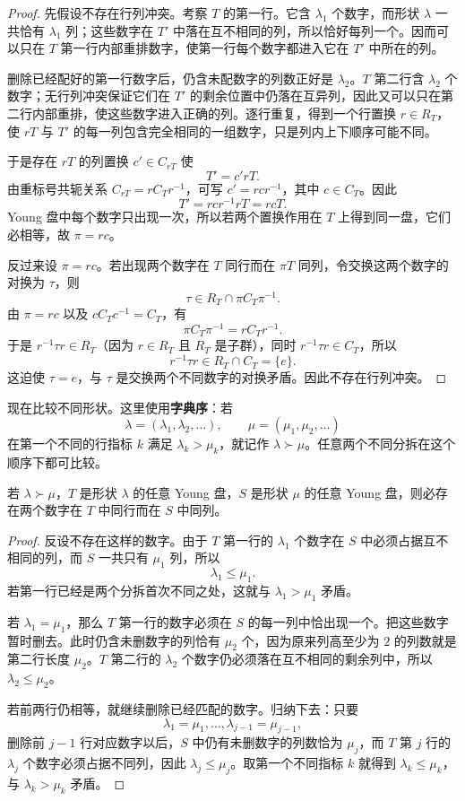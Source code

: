 \begin{proof}
先假设不存在行列冲突。考察 $T$ 的第一行。它含 $\lambda_1$ 个数字，而形状 $\lambda$ 一共恰有 $\lambda_1$ 列；这些数字在 $T'$ 中落在互不相同的列，所以恰好每列一个。因而可以只在 $T$ 第一行内部重排数字，使第一行每个数字都进入它在 $T'$ 中所在的列。

删除已经配好的第一行数字后，仍含未配数字的列数正好是 $\lambda_2$。$T$ 第二行含 $\lambda_2$ 个数字；无行列冲突保证它们在 $T'$ 的剩余位置中仍落在互异列，因此又可以只在第二行内部重排，使这些数字进入正确的列。逐行重复，得到一个行置换 $r\in R_T$，使 $rT$ 与 $T'$ 的每一列包含完全相同的一组数字，只是列内上下顺序可能不同。

于是存在 $rT$ 的列置换 $c'\in C_{rT}$ 使
\[
T'=c'rT.
\]
由重标号共轭关系 $C_{rT}=rC_Tr^{-1}$，可写 $c'=rcr^{-1}$，其中 $c\in C_T$。因此
\[
T'=rcr^{-1}rT=rcT.
\]
Young 盘中每个数字只出现一次，所以若两个置换作用在 $T$ 上得到同一盘，它们必相等，故 $\pi=rc$。

反过来设 $\pi=rc$。若出现两个数字在 $T$ 同行而在 $\pi T$ 同列，令交换这两个数字的对换为 $\tau$，则
\[
\tau\in R_T\cap \pi C_T\pi^{-1}.
\]
由 $\pi=rc$ 以及 $cC_Tc^{-1}=C_T$，有
\[
\pi C_T\pi^{-1}=rC_Tr^{-1}.
\]
于是 $r^{-1}\tau r\in R_T$（因为 $r\in R_T$ 且 $R_T$ 是子群），同时 $r^{-1}\tau r\in C_T$，所以
\[
r^{-1}\tau r\in R_T\cap C_T=\{e\}.
\]
这迫使 $\tau=e$，与 $\tau$ 是交换两个不同数字的对换矛盾。因此不存在行列冲突。
\end{proof}

现在比较不同形状。这里使用\textbf{字典序}：若
\[
\lambda=(\lambda_1,\lambda_2,\dots),\qquad
\mu=(\mu_1,\mu_2,\dots)
\]
在第一个不同的行指标 $k$ 满足 $\lambda_k>\mu_k$，就记作 $\lambda\succ\mu$。任意两个不同分拆在这个顺序下都可比较。

\begin{lemma}[不同形状必产生行列冲突]
若 $\lambda\succ\mu$，$T$ 是形状 $\lambda$ 的任意 Young 盘，$S$ 是形状 $\mu$ 的任意 Young 盘，则必存在两个数字在 $T$ 中同行而在 $S$ 中同列。

\end{lemma}

\begin{proof}
反设不存在这样的数字。由于 $T$ 第一行的 $\lambda_1$ 个数字在 $S$ 中必须占据互不相同的列，而 $S$ 一共只有 $\mu_1$ 列，所以
\[
\lambda_1\le\mu_1.
\]
若第一行已经是两个分拆首次不同之处，这就与 $\lambda_1>\mu_1$ 矛盾。

若 $\lambda_1=\mu_1$，那么 $T$ 第一行的数字必须在 $S$ 的每一列中恰出现一个。把这些数字暂时删去。此时仍含未删数字的列恰有 $\mu_2$ 个，因为原来列高至少为 $2$ 的列数就是第二行长度 $\mu_2$。$T$ 第二行的 $\lambda_2$ 个数字仍必须落在互不相同的剩余列中，所以 $\lambda_2\le\mu_2$。

若前两行仍相等，就继续删除已经匹配的数字。归纳下去：只要
\[
\lambda_1=\mu_1,\dots,\lambda_{j-1}=\mu_{j-1},
\]
删除前 $j-1$ 行对应数字以后，$S$ 中仍有未删数字的列数恰为 $\mu_j$，而 $T$ 第 $j$ 行的 $\lambda_j$ 个数字必须占据不同列，因此 $\lambda_j\le\mu_j$。取第一个不同指标 $k$ 就得到 $\lambda_k\le\mu_k$，与 $\lambda_k>\mu_k$ 矛盾。
\end{proof}

